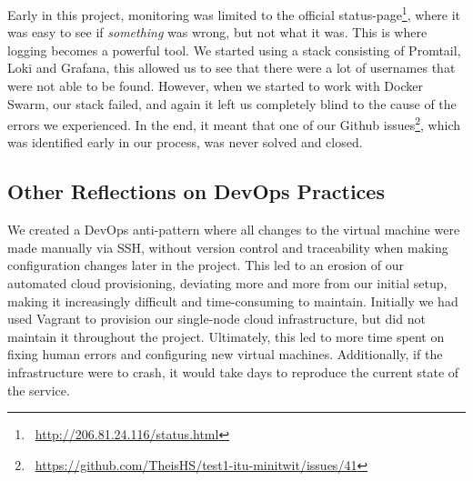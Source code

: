 Early in this project, monitoring was limited to the official status-page\footnote{\ \url{http://206.81.24.116/status.html}}, where it was easy to see if \textit{something} was wrong, but not what it was. 
This is where logging becomes a powerful tool.
We started using a stack consisting of Promtail, Loki and Grafana, this allowed us to see that there were a lot of usernames that were not able to be found. 
However, when we started to work with Docker Swarm, our stack failed, and again it left us completely blind to the cause of the errors we experienced. 
In the end, it meant that one of our Github issues\footnote{\ \url{https://github.com/TheisHS/test1-itu-minitwit/issues/41}}, which was identified early in our process, was never solved and closed.


\subsection{Other Reflections on DevOps Practices}



We created a DevOps anti-pattern where all changes to the virtual machine were made manually via SSH, without version control and traceability when making configuration changes later in the project. 
This led to an erosion of our automated cloud provisioning, deviating more and more from our initial setup, making it increasingly difficult and time-consuming to maintain. Initially we had used Vagrant to provision our single-node cloud infrastructure, but did not maintain it throughout the project.
Ultimately, this led to more time spent on fixing human errors and configuring new virtual machines. 
Additionally, if the infrastructure were to crash, it would take days to reproduce the current state of the service.

